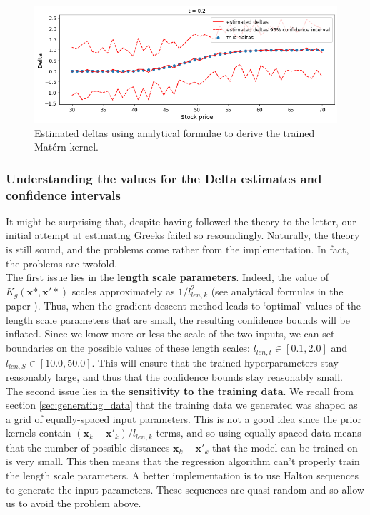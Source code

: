 \documentclass[a4paper,12pt]{article}
\begin{document}
\begin{figure}[H]
    \centering
    \includegraphics[width = 0.9 \linewidth]{delta_anal_BS_t=0.2.png}
    \caption{Estimated deltas using analytical formulae to derive the trained Matérn kernel.}
    \label{fig:delta_anal_BS_t=0.2}
\end{figure}

\subsubsection{Understanding the values for the Delta estimates and confidence intervals}
It might be surprising that, despite having followed the theory to the letter, our initial attempt at estimating Greeks failed so resoundingly. Naturally, the theory is still sound, and the problems come rather from the implementation. In fact, the problems are twofold.\\
The first issue lies in the \textbf{length scale parameters}. Indeed, the value of $K_g(\mathbf{x}*,\mathbf{x}'*)$ scales approximately as $1/l_{len,k}^2$ (see analytical formulas in the paper \cite{Ludkovski2020}). Thus, when the gradient descent method leads to `optimal' values of the length scale parameters that are small, the resulting confidence bounds will be inflated. Since we know more or less the scale of the two inputs, we can set boundaries on the possible values of these length scales: $l_{len,t} \in [0.1,2.0]$ and $l_{len,S} \in [10.0,50.0]$. This will ensure that the trained hyperparameters stay reasonably large, and thus that the confidence bounds stay reasonably small.\\
The second issue lies in the \textbf{sensitivity to the training data}. We recall from section \ref{sec:generating_data} that the training data we generated was shaped as a grid of equally-spaced input parameters. This is not a good idea since the prior kernels contain $(\mathbf{x}_k-\mathbf{x'}_k)/l_{len,k}$ terms, and so using equally-spaced data means that the number of possible distances $\mathbf{x}_k-\mathbf{x'}_k$ that the model can be trained on is very small. This then means that the regression algorithm can't properly train the length scale parameters. A better implementation is to use Halton sequences to generate the input parameters. These sequences are quasi-random and so allow us to avoid the problem above.\\
\end{document}
